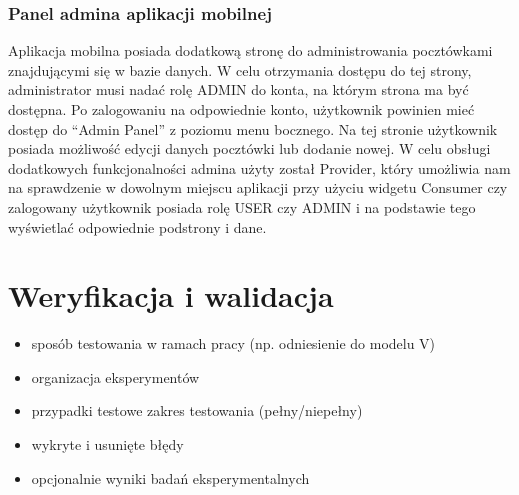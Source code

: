 \documentclass[a4paper,twoside,12pt]{book}
\begin{document}
\subsection{Panel admina aplikacji mobilnej}

Aplikacja mobilna posiada dodatkową stronę do administrowania pocztówkami znajdującymi się w bazie danych. W celu otrzymania dostępu do tej strony, administrator musi nadać rolę ADMIN do konta, na którym strona ma być dostępna. Po zalogowaniu na odpowiednie konto, użytkownik powinien mieć dostęp do ``Admin Panel'' z poziomu menu bocznego. 
Na tej stronie użytkownik posiada możliwość edycji danych pocztówki lub dodanie nowej. W celu obsługi dodatkowych funkcjonalności admina użyty został Provider, który umożliwia nam na sprawdzenie w dowolnym miejscu aplikacji przy użyciu widgetu Consumer czy zalogowany użytkownik posiada rolę USER czy ADMIN i na podstawie tego wyświetlać odpowiednie podstrony i dane.
\chapter{Weryfikacja i walidacja}
\label{ch:06}
\begin{itemize}
\item sposób testowania w ramach pracy (np. odniesienie do modelu V)
\item organizacja eksperymentów
\item przypadki testowe zakres testowania (pełny/niepełny)
\item wykryte i usunięte błędy
\item opcjonalnie wyniki badań eksperymentalnych
\end{itemize}
\end{document}
